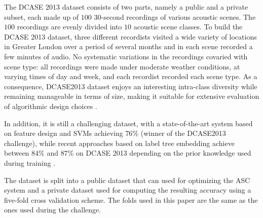 \documentclass[journal]{IEEEtran}
\newcommand{\ja}[1]{\textcolor{magenta}{Joakim : #1}}
\begin{document}
The DCASE 2013 dataset consists of two parts, namely a public and a private subset, each made up of $100$ $30$-second recordings of various acoustic scenes. The $100$ recordings are evenly divided into $10$ acoustic scene classes. To build the DCASE 2013 dataset, three different recordists visited a wide variety of locations in Greater London over a period of several months and in each scene recorded a few minutes of audio. No
systematic variations in the recordings covaried with scene
type: all recordings were made under moderate weather conditions, at varying times of day and week, and each recordist recorded each scene type. As a consequence, DCASE2013 dataset enjoys an interesting intra-class diversity while remaining manageable in terms of size, making it suitable for extensive evaluation of algorithmic design choices \cite{lagrange:hal-01082501}. 

In addition, it is still a challenging dataset, with a state-of-the-art system based on feature design and SVMs achieving $76\%$ \cite{roma2013} (winner of the DCASE2013 challenge), while recent approaches based on label tree embedding achieve between $84\%$ and $87\%$ on DCASE 2013 depending on the prior knowledge used during training \cite{phan2016label}.


The dataset is split into a public dataset that can used for optimizing the ASC system and a private dataset used for computing the resulting accuracy using a five-fold cross validation scheme. The folds used in this paper are the same as the ones used during the challenge.

\end{document}
